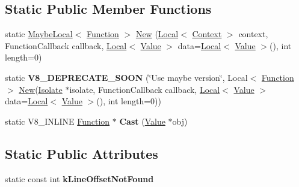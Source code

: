 \subsection*{Static Public Member Functions}
\begin{DoxyCompactItemize}
\item 
static \hyperlink{classv8_1_1_maybe_local}{Maybe\+Local}$<$ \hyperlink{classv8_1_1_function}{Function} $>$ \hyperlink{classv8_1_1_function_a53f1f98d49eef79339460e47f2b1e29e}{New} (\hyperlink{classv8_1_1_local}{Local}$<$ \hyperlink{classv8_1_1_context}{Context} $>$ context, Function\+Callback callback, \hyperlink{classv8_1_1_local}{Local}$<$ \hyperlink{classv8_1_1_value}{Value} $>$ data=\hyperlink{classv8_1_1_local}{Local}$<$ \hyperlink{classv8_1_1_value}{Value} $>$(), int length=0)
\item 
static {\bfseries V8\+\_\+\+D\+E\+P\+R\+E\+C\+A\+T\+E\+\_\+\+S\+O\+ON} (\char`\"{}Use maybe version\char`\"{}, Local$<$ \hyperlink{classv8_1_1_function}{Function} $>$ \hyperlink{classv8_1_1_function_a53f1f98d49eef79339460e47f2b1e29e}{New}(\hyperlink{classv8_1_1_isolate}{Isolate} $\ast$isolate, Function\+Callback callback,                                                                                               \hyperlink{classv8_1_1_local}{Local}$<$ \hyperlink{classv8_1_1_value}{Value} $>$ data=\hyperlink{classv8_1_1_local}{Local}$<$ \hyperlink{classv8_1_1_value}{Value} $>$(), int length=0))\hypertarget{classv8_1_1_function_ac6281ad77b5f3ab414b7fd315471326d}{}\label{classv8_1_1_function_ac6281ad77b5f3ab414b7fd315471326d}

\item 
static V8\+\_\+\+I\+N\+L\+I\+NE \hyperlink{classv8_1_1_function}{Function} $\ast$ {\bfseries Cast} (\hyperlink{classv8_1_1_value}{Value} $\ast$obj)\hypertarget{classv8_1_1_function_af24f38bcc0769519816cda1f6a154ff8}{}\label{classv8_1_1_function_af24f38bcc0769519816cda1f6a154ff8}

\end{DoxyCompactItemize}
\subsection*{Static Public Attributes}
\begin{DoxyCompactItemize}
\item 
static const int {\bfseries k\+Line\+Offset\+Not\+Found}\hypertarget{classv8_1_1_function_acf0af24f79908e405a6ac435277596d9}{}\label{classv8_1_1_function_acf0af24f79908e405a6ac435277596d9}

\end{DoxyCompactItemize}
